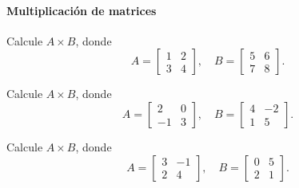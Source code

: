 
\paragraph{Multiplicación de matrices}

\begin{ejercicio}
Calcule $A \times B$, donde
\[
A=\begin{bmatrix} 1 & 2 \\ 3 & 4 \end{bmatrix}, \quad
B=\begin{bmatrix} 5 & 6 \\ 7 & 8 \end{bmatrix}.
\]
\end{ejercicio}
\muestraSolucion{
\[
AB=\begin{bmatrix} 1(5)+2(7) & 1(6)+2(8) \\ 3(5)+4(7) & 3(6)+4(8) \end{bmatrix}=
\begin{bmatrix} 19 & 22 \\ 43 & 50 \end{bmatrix}.
\]
}

\begin{ejercicio}
Calcule $A \times B$, donde
\[
A=\begin{bmatrix} 2 & 0 \\ -1 & 3 \end{bmatrix}, \quad
B=\begin{bmatrix} 4 & -2 \\ 1 & 5 \end{bmatrix}.
\]
\end{ejercicio}
\muestraSolucion{
\[
AB=\begin{bmatrix} 8 & -4 \\ -1 & 17 \end{bmatrix}.
\]
}

\begin{ejercicio}
Calcule $A \times B$, donde
\[
A=\begin{bmatrix} 3 & -1 \\ 2 & 4 \end{bmatrix}, \quad
B=\begin{bmatrix} 0 & 5 \\ 2 & 1 \end{bmatrix}.
\]
\end{ejercicio}
\muestraSolucion{
\[
AB=\begin{bmatrix} -2 & 14 \\ 8 & 14 \end{bmatrix}.
\]
}

